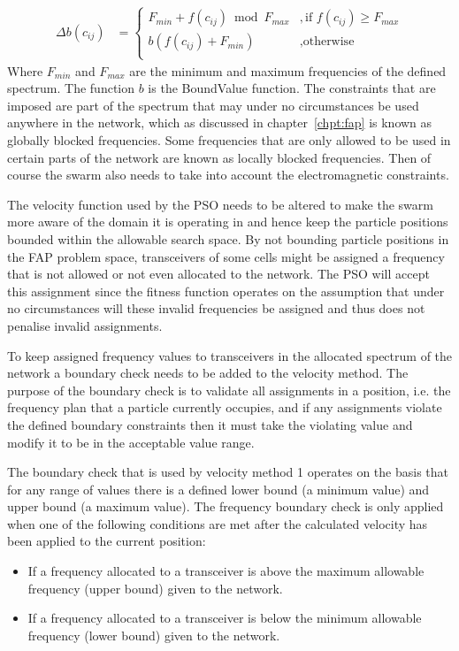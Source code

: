 \begin{align}
\label{eq:boundEq}
    \Delta b(c_{ij}) &= 
    \begin{cases}
    F_{min} + f(c_{ij}) \bmod F_{max} &, \text{if $f(c_{ij}) \geq F_{max}$}\\ 
        b(f(c_{ij}) + F_{min}) &, \text{otherwise}\\ 
    \end{cases}
\end{align}
Where $F_{min}$ and $F_{max}$ are the minimum and maximum frequencies of the defined spectrum. The function $b$ is the BoundValue function. The constraints that are imposed are part of the spectrum that may under no circumstances be used anywhere in the network, which as discussed in chapter~\ref{chpt:fap} is known as globally blocked frequencies. Some frequencies that are only allowed to be used in certain parts of the network are known as locally blocked frequencies. Then of course the swarm also needs to take into account the electromagnetic constraints.

The velocity function used by the \gls{PSO} needs to be altered to make the swarm more aware of the domain it is operating in and hence keep the particle positions bounded within the allowable search space. By not bounding particle positions in the \gls{FAP} problem space, transceivers of some cells might be assigned a frequency that is not allowed or not even allocated to the network. The \gls{PSO} will accept this assignment since the fitness function operates on the assumption that under no circumstances will these invalid frequencies be assigned and thus does not penalise invalid assignments.

To keep assigned frequency values to transceivers in the allocated spectrum of the network a boundary check needs to be added to the velocity method. The purpose of the boundary check is to validate all assignments in a position, i.e. the frequency plan that a particle currently occupies, and if any assignments violate the defined boundary constraints then it must take the violating value and modify it to be in the acceptable value range.

The boundary check that is used by velocity method 1 operates on the basis that for any range of values there is a defined lower bound (a minimum value) and upper bound (a maximum value). The frequency boundary check is only applied when one of the following conditions are met after the calculated velocity has been applied to the current position:
\begin{itemize}
\item If a frequency allocated to a transceiver is above the maximum allowable frequency (upper bound) given to the network. 
\item If a frequency allocated to a transceiver is below the minimum allowable frequency (lower bound) given to the network.
\end{itemize}

